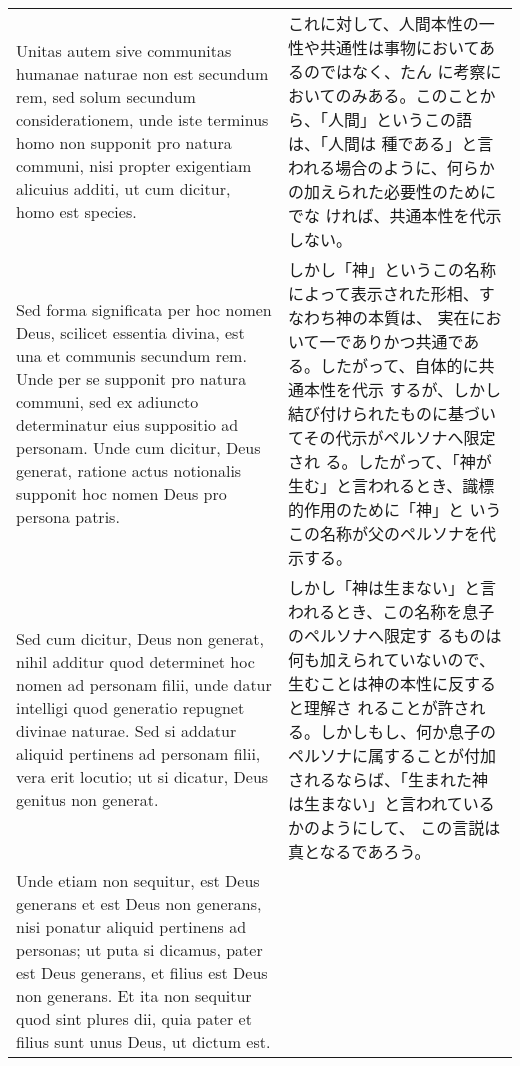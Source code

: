 \documentclass[10pt]{jsarticle} %
\begin{document}
\begin{longtable}{p{21em}p{21em}}
\\

Unitas autem sive
communitas humanae naturae non est secundum rem, sed solum secundum
considerationem, unde iste terminus homo non supponit pro natura
communi, nisi propter exigentiam alicuius additi, ut cum dicitur, homo
est species. 



&

これに対して、人間本性の一性や共通性は事物においてあるのではなく、たん
に考察においてのみある。このことから、「人間」というこの語は、「人間は
種である」と言われる場合のように、何らかの加えられた必要性のためにでな
ければ、共通本性を代示しない。

\\


Sed forma significata per hoc nomen Deus, scilicet essentia
divina, est una et communis secundum rem. Unde per se supponit pro
natura communi, sed ex adiuncto determinatur eius suppositio ad
personam. Unde cum dicitur, Deus generat, ratione actus notionalis
supponit hoc nomen Deus pro persona patris. 

&

しかし「神」というこの名称によって表示された形相、すなわち神の本質は、
実在において一でありかつ共通である。したがって、自体的に共通本性を代示
するが、しかし結び付けられたものに基づいてその代示がペルソナへ限定され
る。したがって、「神が生む」と言われるとき、識標的作用のために「神」と
いうこの名称が父のペルソナを代示する。

\\

Sed cum dicitur, Deus non
generat, nihil additur quod determinet hoc nomen ad personam filii, unde
datur intelligi quod generatio repugnet divinae naturae. Sed si addatur
aliquid pertinens ad personam filii, vera erit locutio; ut si dicatur,
Deus genitus non generat. 


&

しかし「神は生まない」と言われるとき、この名称を息子のペルソナへ限定す
 るものは何も加えられていないので、生むことは神の本性に反すると理解さ
 れることが許される。しかしもし、何か息子のペルソナに属することが付加
 されるならば、「生まれた神は生まない」と言われているかのようにして、
 この言説は真となるであろう。

\\



Unde etiam non sequitur, est Deus generans et
est Deus non generans, nisi ponatur aliquid pertinens ad personas; ut
puta si dicamus, pater est Deus generans, et filius est Deus non
generans. Et ita non sequitur quod sint plures dii, quia pater et filius
sunt unus Deus, ut dictum est.


\end{longtable}
\end{document}
